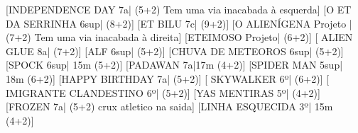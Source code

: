 \begin{CGSectorRoutes}
    [INDEPENDENCE DAY 7a| (5+2) Tem uma via inacabada à esquerda]
    [O ET DA SERRINHA 6sup| (8+2)]
    [ET BILU 7c| (9+2)]
    [O ALIENÍGENA Projeto | (7+2) Tem uma via inacabada à direita]
    [ETEIMOSO Projeto| (6+2)]
    [ ALIEN GLUE 8a| (7+2)]
    [ALF 6sup| (5+2)]
    [CHUVA DE METEOROS 6sup| (5+2)]
    [SPOCK 6sup| 15m (5+2)]
    [PADAWAN 7a|17m (4+2)]
    [SPIDER MAN 5sup| 18m (6+2)]
    [HAPPY BIRTHDAY 7a| (5+2)]
    [ SKYWALKER 6º| (6+2)]
    [ IMIGRANTE CLANDESTINO 6º| (5+2)]
    [YAS MENTIRAS 5º| (4+2)]
    [FROZEN 7a| (5+2) crux atletico na saida]
    [LINHA ESQUECIDA 3º| 15m (4+2)]
\end{CGSectorRoutes}


